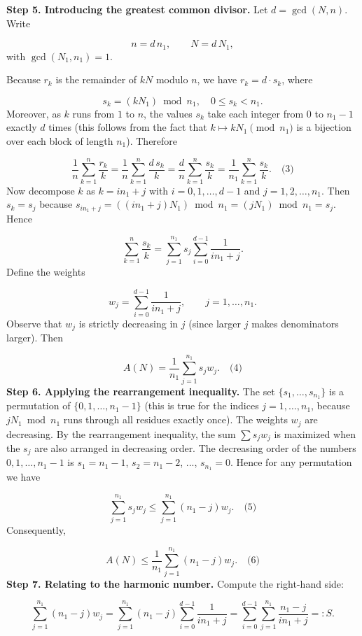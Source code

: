 \documentclass{llmxive}
\begin{document}
\textbf{Step 5. Introducing the greatest common divisor.} Let \(d = \gcd(N,n)\). Write\par
\[
n = d\,n_1,\qquad N = d\,N_1,
\]
with \(\gcd(N_1,n_1)=1\).\par
Because \(r_k\) is the remainder of \(kN\) modulo \(n\), we have \(r_k = d\cdot s_k\), where\par
\[
s_k = (k N_1) \bmod n_1,\quad 0\le s_k < n_1.
\]
Moreover, as \(k\) runs from \(1\) to \(n\), the values \(s_k\) take each integer from \(0\) to \(n_1-1\) exactly \(d\) times (this follows from the fact that \(k\mapsto kN_1\pmod{n_1}\) is a bijection over each block of length \(n_1\)). Therefore\par
\[
\frac1n\sum_{k=1}^{n}\frac{r_k}{k} = \frac1n\sum_{k=1}^{n}\frac{d\,s_k}{k} = \frac{d}{n}\sum_{k=1}^{n}\frac{s_k}{k} = \frac{1}{n_1}\sum_{k=1}^{n}\frac{s_k}{k}. \quad\text{(3)}
\]
Now decompose \(k\) as \(k = i n_1 + j\) with \(i=0,1,\dots,d-1\) and \(j=1,2,\dots,n_1\). Then \(s_k = s_j\) because \(s_{i n_1 + j} = ((i n_1 + j)N_1)\bmod n_1 = (j N_1)\bmod n_1 = s_j\). Hence\par
\[
\sum_{k=1}^{n}\frac{s_k}{k} = \sum_{j=1}^{n_1} s_j \sum_{i=0}^{d-1}\frac{1}{i n_1 + j}.
\]
Define the weights\par
\[
w_j = \sum_{i=0}^{d-1}\frac{1}{i n_1 + j},\qquad j=1,\dots,n_1.
\]
Observe that \(w_j\) is strictly decreasing in \(j\) (since larger \(j\) makes denominators larger). Then\par
\[
A(N) = \frac{1}{n_1}\sum_{j=1}^{n_1} s_j w_j. \quad\text{(4)}
\]
\textbf{Step 6. Applying the rearrangement inequality.} The set \(\{s_1,\dots,s_{n_1}\}\) is a permutation of \(\{0,1,\dots,n_1-1\}\) (this is true for the indices \(j=1,\dots,n_1\), because \(j N_1 \bmod n_1\) runs through all residues exactly once). The weights \(w_j\) are decreasing. By the rearrangement inequality, the sum \(\sum s_j w_j\) is maximized when the \(s_j\) are also arranged in decreasing order. The decreasing order of the numbers \(0,1,\dots,n_1-1\) is \(s_1=n_1-1\), \(s_2=n_1-2\), ..., \(s_{n_1}=0\). Hence for any permutation we have\par
\[
\sum_{j=1}^{n_1} s_j w_j \le \sum_{j=1}^{n_1} (n_1 - j) w_j. \quad\text{(5)}
\]
Consequently,\par
\[
A(N) \le \frac{1}{n_1}\sum_{j=1}^{n_1} (n_1 - j) w_j. \quad\text{(6)}
\]
\textbf{Step 7. Relating to the harmonic number.} Compute the right-hand side:\par
\[
\sum_{j=1}^{n_1} (n_1 - j) w_j = \sum_{j=1}^{n_1} (n_1 - j)\sum_{i=0}^{d-1}\frac{1}{i n_1 + j} = \sum_{i=0}^{d-1}\sum_{j=1}^{n_1}\frac{n_1 - j}{i n_1 + j} =: S.
\]
\end{document}
